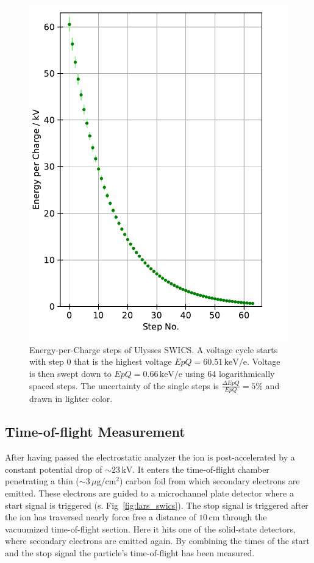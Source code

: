%
\begin{figure}[h]
		\centering
		\includegraphics[scale = 0.7]{Figures/epq_err.pdf}
		\caption{Energy-per-Charge steps of Ulysses SWICS. A voltage cycle starts with step 0 that is the highest voltage $EpQ = 60.51\, \mathrm{keV/e}$. Voltage is then swept down to $EpQ = 0.66\, \mathrm{keV/e}$ using 64 logarithmically spaced steps. The uncertainty of the single steps is $\frac{\Delta EpQ}{EpQ} = 5\%$ and drawn in lighter color.
		} \label{fig:epq}
\end{figure}
%
%
%
\subsection{Time-of-flight Measurement}
After having passed the electrostatic analyzer the ion is post-accelerated by a constant potential drop of $\sim 23\,\mathrm{kV}$. It enters the time-of-flight chamber penetrating a thin ($\sim 3\,\mu \mathrm{g / cm^2}$) carbon foil from which secondary electrons are emitted. These electrons are guided to a microchannel plate detector where a start signal is triggered (s. Fig~\ref{fig:lars_swics}). The stop signal is triggered after the ion has traversed nearly force free a distance of $10\,\mathrm{cm}$ through the vacuumized time-of-flight section. Here it hits one of the solid-state detectors, where secondary electrons are emitted again. By combining the times of the start and the stop signal the particle's time-of-flight has been measured.
